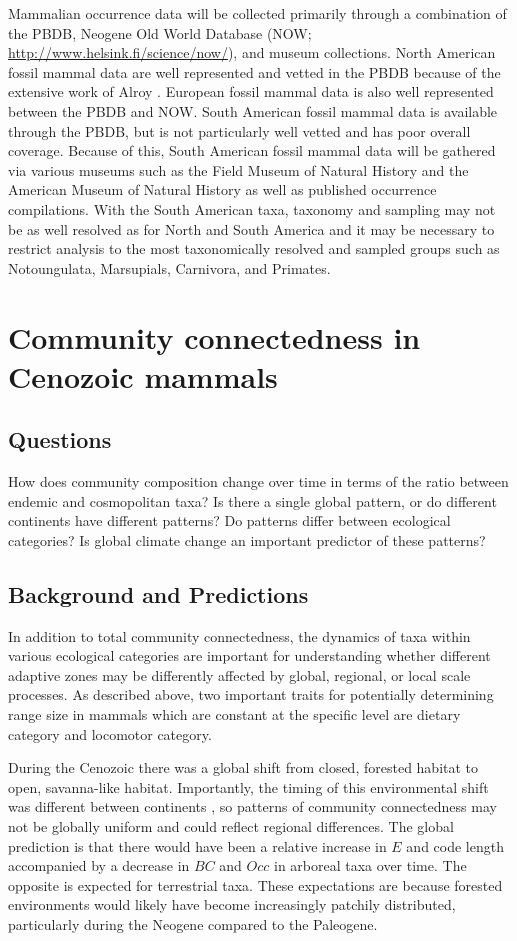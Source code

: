 \documentclass[12pt,letterpaper]{article}
\begin{document}
Mammalian occurrence data will be collected primarily through a combination of the PBDB, Neogene Old World Database (NOW; \url{http://www.helsink.fi/science/now/}), and museum collections. North American fossil mammal data are well represented and vetted in the PBDB because of the extensive work of Alroy \citep{Alroy1996a,Alroy1998,Alroy2000g}. European fossil mammal data is also well represented between the PBDB and NOW. South American fossil mammal data is available through the PBDB, but is not particularly well vetted and has poor overall coverage. Because of this, South American fossil mammal data will be gathered via various museums such as the Field Museum of Natural History and the American Museum of Natural History as well as published occurrence compilations. With the South American taxa, taxonomy and sampling may not be as well resolved as for North and South America and it may be necessary to restrict analysis to the most taxonomically resolved and sampled groups such as Notoungulata, Marsupials, Carnivora, and Primates.


\section{Community connectedness in Cenozoic mammals}

\subsection{Questions} 
How does community composition change over time in terms of the ratio between endemic and cosmopolitan taxa? Is there a single global pattern, or do different continents have different patterns? Do patterns differ between ecological categories? Is global climate change an important predictor of these patterns?

\subsection{Background and Predictions}
In addition to total community connectedness, the dynamics of taxa within various ecological categories are important for understanding whether different adaptive zones may be differently affected by global, regional, or local scale processes. As described above, two important traits for potentially determining range size in mammals which are constant at the specific level are dietary category and locomotor category. 

During the Cenozoic there was a global shift from closed, forested habitat to open, savanna-like habitat. Importantly, the timing of this environmental shift was different between continents \citep{Stromberg2005,Stromberg2013}, so patterns of community connectedness may not be globally uniform and could reflect regional differences. The global prediction is that there would have been a relative increase in \(E\) and code length accompanied by a decrease in \(BC\) and \(Occ\) in arboreal taxa over time. The opposite is expected for terrestrial taxa. These expectations are because forested environments would likely have become increasingly patchily distributed, particularly during the Neogene compared to the Paleogene.
\end{document}
